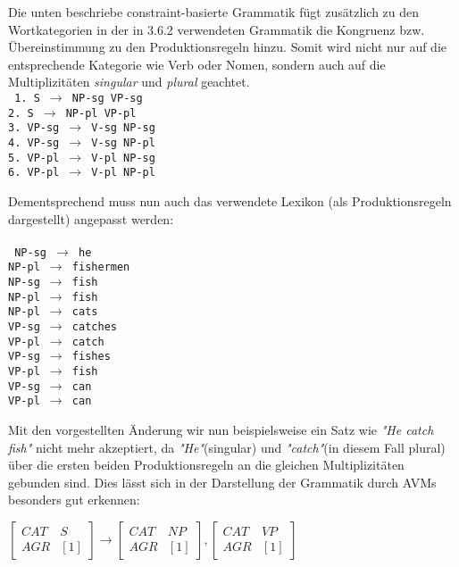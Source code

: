 \documentclass[12pt]{paper}
\begin{document}
Die unten beschriebe constraint-basierte Grammatik fügt zusätzlich zu den Wortkategorien in der in 3.6.2 verwendeten Grammatik die Kongruenz bzw. Übereinstimmung zu den Produktionsregeln hinzu. Somit wird nicht nur auf die entsprechende Kategorie wie Verb oder Nomen, sondern auch auf die Multiplizitäten \textit{singular} und \textit{plural} geachtet. \newline
\\
\tt
1. S $\rightarrow$ NP-sg VP-sg\\
2. S $\rightarrow$ NP-pl VP-pl\\
3. VP-sg $\rightarrow$ V-sg NP-sg\\
4. VP-sg $\rightarrow$ V-sg NP-pl\\
5. VP-pl $\rightarrow$ V-pl NP-sg\\
6. VP-pl $\rightarrow$ V-pl NP-pl\\
\rm

Dementsprechend muss nun auch das verwendete Lexikon (als Produktionsregeln dargestellt) angepasst werden:\\
\\
\tt
NP-sg $\rightarrow$ he\\
NP-pl $\rightarrow$ fishermen\\
NP-sg $\rightarrow$ fish\\
NP-pl $\rightarrow$ fish\\
NP-pl $\rightarrow$ cats\\
VP-sg $\rightarrow$ catches\\
VP-pl $\rightarrow$ catch\\
VP-sg $\rightarrow$ fishes\\
VP-pl $\rightarrow$ fish\\
VP-sg $\rightarrow$ can\\
VP-pl $\rightarrow$ can\\
\rm

Mit den vorgestellten Änderung wir nun beispielsweise ein Satz wie \textit{"He catch fish"} nicht mehr akzeptiert, da \textit{"He"}(singular) und \textit{"catch"}(in diesem Fall plural) über die ersten beiden Produktionsregeln an die gleichen Multiplizitäten gebunden sind. 
Dies lässt sich in der Darstellung der Grammatik durch AVMs besonders gut erkennen:

$\begin{bmatrix} 
CAT & S \\
AGR & [1]
\end{bmatrix} 
\rightarrow
\begin{bmatrix} 
CAT & NP \\
AGR & [1]
\end{bmatrix},
\begin{bmatrix} 
CAT & VP \\
AGR & [1] 
\end{bmatrix}$ 
\end{document}
